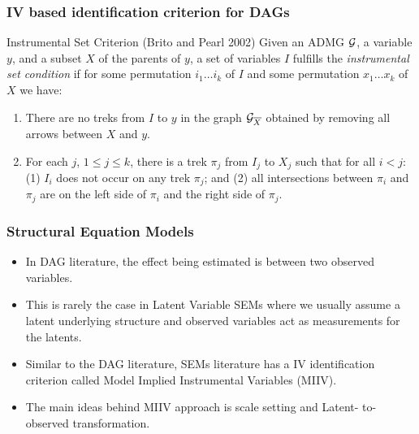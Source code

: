 \documentclass{beamer}
\begin{document}
\begin{frame}
	\frametitle{IV based identification criterion for DAGs}
	\begin{block}{Instrumental Set Criterion (Brito and Pearl 2002)}
Given an ADMG $\cal
	G$, a variable $y$, and a subset $X$ of the parents of $y$, 
	a set of variables
	$I$ fulfills the 
	\emph{instrumental set condition}
	if for {some} permutation $ i_1 \ldots i_k $ of
	$ I $ and {some} permutation
	$ x_1 \ldots x_k $ of $ X $ we have: 
	\begin{enumerate}
		\item There are no treks from $I$ to $y$ in the graph ${\cal
			G}_{\overline{X}}$ obtained by removing all arrows 
			between $X$ and $y$. 
		\item For each $j$, $1 \leq j \leq k$, there is a trek $\pi_j$ from
			$I_j$ to $X_j$ such that for all $i < j$: (1) $I_i$ does not
			occur on any trek $\pi_j$; and (2) all intersections between
			$\pi_i$ and $\pi_j$ are on the left side of $\pi_i$ and the
			right side of $\pi_j$.
	\end{enumerate}
	\end{block}
\end{frame}

\begin{frame}
	\frametitle{Structural Equation Models}
	\begin{itemize}
		\item In DAG literature, the effect being estimated is between two
			observed variables.
		\item This is rarely the case in Latent Variable SEMs where we usually
			assume a latent underlying structure and observed variables
			act as measurements for the latents.
		\item Similar to the DAG literature, SEMs literature has a IV 
			identification criterion called Model Implied Instrumental 
			Variables (MIIV).
		\item The main ideas behind MIIV approach is scale setting and Latent-
			to-observed transformation.
	\end{itemize}
\end{frame}
\end{document}
